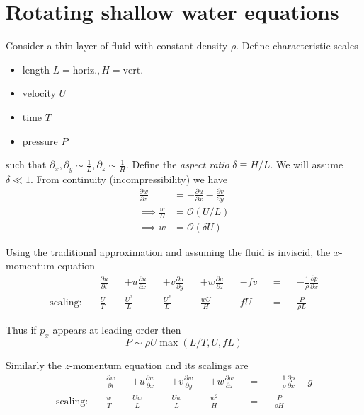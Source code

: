 \documentclass{jknotes}
\begin{document}
\section{Rotating shallow water equations}
Consider a thin layer of fluid with constant density $\rho$. Define
characteristic scales
\begin{itemize}
	\item length $L = \text{horiz.}, H = \text{vert.}$
	\item velocity $U$
	\item time $T$
	\item pressure $P$
\end{itemize}
such that $\partial_x, \partial_y \sim \frac{1}{L}, \partial_z \sim
\frac{1}{H}$. Define the \emph{aspect ratio} $\delta \equiv H/L$. We will
assume $\delta \ll 1$. From continuity (incompressibility) we have
\begin{equation}
	\begin{aligned}
		\frac{\partial w}{\partial z} &= -\frac{\partial u}{\partial x} -
		\frac{\partial v}{\partial y}  \\
		\implies \frac{w}{H} &= \mathcal{O}(U/L) \\
		\implies w &= \mathcal{O}(\delta U)
	\end{aligned}
\end{equation}

Using the traditional approximation and assuming the fluid is inviscid, the
$x$-momentum equation
\begin{align}
	&\frac{\partial u}{\partial t} &&+ u \frac{\partial u}{\partial x} &&+v
	\frac{\partial u}{\partial y} &&+ w\frac{\partial u}{\partial z} &&- fv &&=
						&&-\frac{1}{\rho} \frac{\partial p}{\partial x}
	\label{eq:swxmom}\\
	\text{scaling:}\hspace{1em} &\frac{U}{T} &&\frac{U^2}{L} && \frac{U^2}{L}
					&&\frac{wU}{H} &&fU &&= &&\frac{P}{\rho L}
\end{align}

Thus if $p_x$ appears at leading order then
\begin{equation}
	P \sim \rho U \max(L/T, U, fL)
\end{equation}

Similarly the $z$-momentum equation and its scalings are
\begin{align}
	&\frac{\partial w}{\partial t} &&+ u \frac{\partial w}{\partial x} &&+v
	\frac{\partial w}{\partial y} &&+ w\frac{\partial w}{\partial z} &&=
						&&-\frac{1}{\rho} \frac{\partial p}{\partial x} - g
	\label{eq:swzmom} \\
	\text{scaling:}\hspace{1em} &\frac{w}{T} &&\frac{Uw}{L} && \frac{Uw}{L}
					&&\frac{w^2}{H} &&= &&\frac{P}{\rho H}
\end{align}
\end{document}

